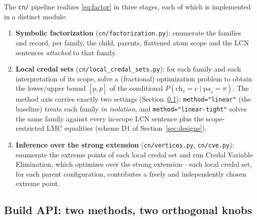 \documentclass[11pt]{article}
\begin{document}
The \texttt{cn/} pipeline realizes \eqref{eq:factor} in three stages, each of which is
implemented in a distinct module:
\begin{enumerate}
  \item \textbf{Symbolic factorization} (\texttt{cn/factorization.py}): enumerate the
    families and record, per family, the child, parents, flattened atom scope and the
    LCN sentences \emph{attached} to that family.
  \item \textbf{Local credal sets} (\texttt{cn/local\_credal\_sets.py}): for each family
    and each interpretation of its scope, solve a (fractional) optimization problem to
    obtain the lower/upper bound $[\underline{p},\overline{p}]$ of the conditional
    $P(\mathrm{ch}_v=c \mid \mathrm{pa}_v=\pi)$. The method axis carries exactly two
    settings (Section~\ref{sec:api}): \texttt{method="linear"} (the baseline) treats each
    family \emph{in isolation}, and \texttt{method="linear-tight"} solves the same family
    against every in-scope LCN sentence plus the scope-restricted LMC equalities (scheme
    D1 of Section~\ref{sec:designs}).
  \item \textbf{Inference over the strong extension} (\texttt{cn/vertices.py},
    \texttt{cn/cve.py}): enumerate the extreme points of each local credal set and run
    Credal Variable Elimination, which optimizes over the strong extension---each local
    credal set, for each parent configuration, contributes a freely and independently
    chosen extreme point.
\end{enumerate}

\subsection{Build API: two methods, two orthogonal knobs}\label{sec:api}
\end{document}
